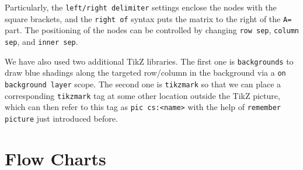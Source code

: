 Particularly, the \texttt{left/right delimiter} settings enclose the nodes with the square brackets, and the \texttt{right of} syntax puts the matrix to the right of the \texttt{A=} part. The positioning of the nodes can be controlled by changing \texttt{row sep}, \texttt{column sep}, and \texttt{inner sep}. 

We have also used two additional TikZ libraries. The first one is \texttt{backgrounds} to draw blue shadings along the targeted row/column in the background via a \texttt{on background layer} scope. The second one is \texttt{tikzmark} so that we can place a corresponding \texttt{tikzmark} tag at some other location outside the TikZ picture, which can then refer to this tag as \texttt{pic cs:<name>} with the help of \texttt{remember picture} just introduced before.

\section{Flow Charts}

